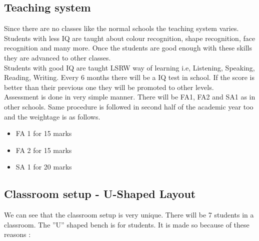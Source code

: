 \subsection{Teaching system}
Since there are no classes like the normal schools the teaching system varies. Students with less IQ are taught about colour recognition, shape recognition, face recognition and many more. Once the students are good enough with these skills they are advanced to other classes. \\

Students with good IQ are taught LSRW way of learning i.e, Listening, Speaking, Reading, Writing. Every 6 months there will be a IQ test in school. If the score is better than their previous one they will be promoted to other levels. \\

Assessment is done in very simple manner. There will be FA1, FA2 and SA1 as in other schools. Same procedure is followed in second half of the academic year too and the weightage is as follows.
\begin{itemize}
    \item FA 1 for 15 marks
    \item FA 2 for 15 marks 
    \item SA 1 for 20 marks
\end{itemize}
\subsection{Classroom setup - U-Shaped Layout}
We can see that the classroom setup is very unique. There will be 7 students in a classroom. The ''U'' shaped bench is for students. It is made so because of these reasons :

